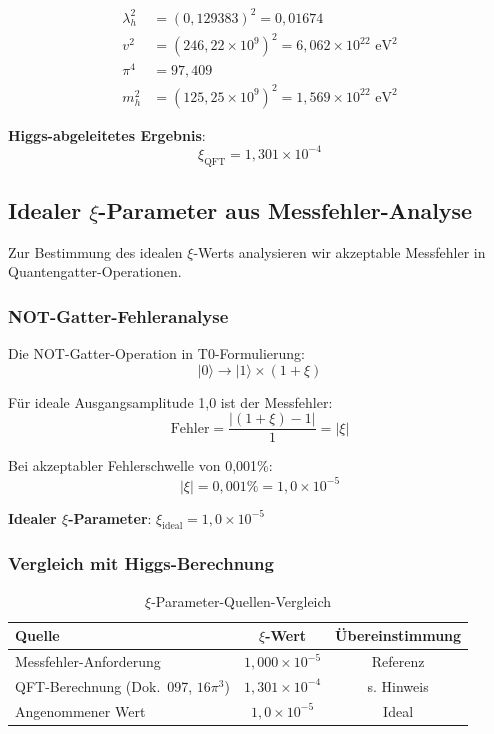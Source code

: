 	\begin{align}
		\lambda_h^2 &= (0,129383)^2 = 0,01674 \\
		v^2 &= (246,22 \times 10^9)^2 = 6,062 \times 10^{22} \text{ eV}^2 \\
		\pi^4 &= 97,409 \\
		m_h^2 &= (125,25 \times 10^9)^2 = 1,569 \times 10^{22} \text{ eV}^2
	\end{align}
	
	\textbf{Higgs-abgeleitetes Ergebnis}:
	\begin{equation}
		\xi_{\text{QFT}} = 1{,}301 \times 10^{-4}
	\end{equation}
	
	\subsection{Idealer $\xi$-Parameter aus Messfehler-Analyse}
	
	Zur Bestimmung des idealen $\xi$-Werts analysieren wir akzeptable Messfehler in Quantengatter-Operationen.
	
	\subsubsection{NOT-Gatter-Fehleranalyse}
	
	Die NOT-Gatter-Operation in T0-Formulierung:
	\begin{equation}
		|0\rangle \rightarrow |1\rangle \times (1 + \xi)
	\end{equation}
	
	Für ideale Ausgangsamplitude 1,0 ist der Messfehler:
	\begin{equation}
		\text{Fehler} = \frac{|(1 + \xi) - 1|}{1} = |\xi|
	\end{equation}
	
	Bei akzeptabler Fehlerschwelle von 0,001\%:
	\begin{equation}
		|\xi| = 0,001\% = 1,0 \times 10^{-5}
	\end{equation}
	
	\textbf{Idealer $\xi$-Parameter}: $\xi_{\text{ideal}} = 1,0 \times 10^{-5}$
	
	\subsubsection{Vergleich mit Higgs-Berechnung}
	
	\begin{table}[htbp]
		\centering
		\begin{tabular}{lcc}
			\toprule
			\textbf{Quelle} & \textbf{$\xi$-Wert} & \textbf{Übereinstimmung} \\
			\midrule
			Messfehler-Anforderung & $1,000 \times 10^{-5}$ & Referenz \\
			QFT-Berechnung (Dok.~097, $16\pi^3$) & $1{,}301 \times 10^{-4}$ & s. Hinweis \\
			Angenommener Wert & $1,0 \times 10^{-5}$ & Ideal \\
			\bottomrule
		\end{tabular}
		\caption{$\xi$-Parameter-Quellen-Vergleich}
	\end{table}
	
